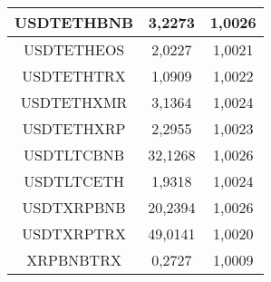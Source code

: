 \begin{table}
\begin{tabular}{|| c | c | c ||}
 \hline USDTETHBNB & 3,2273 & 1,0026\\ 
 \hline USDTETHEOS & 2,0227 & 1,0021\\ 
 \hline USDTETHTRX & 1,0909 & 1,0022\\ 
 \hline USDTETHXMR & 3,1364 & 1,0024\\ 
 \hline USDTETHXRP & 2,2955 & 1,0023\\ 
 \hline USDTLTCBNB & 32,1268 & 1,0026\\ 
 \hline USDTLTCETH & 1,9318 & 1,0024\\ 
 \hline USDTXRPBNB & 20,2394 & 1,0026\\ 
 \hline USDTXRPTRX & 49,0141 & 1,0020\\ 
 \hline XRPBNBTRX & 0,2727 & 1,0009\\ 
 \hline
\end{tabular}
\end{table}